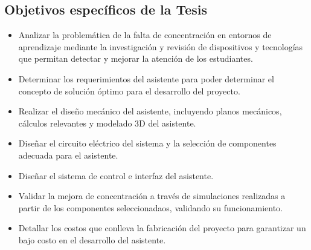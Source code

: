             \subsection{Objetivos específicos de la Tesis}
        \begin{itemize}
            \item Analizar la problemática de la falta  de concentración en entornos de aprendizaje mediante la investigación y revisión de dispositivos y tecnologías que permitan detectar y mejorar la atención de los estudiantes.
            \item Determinar los requerimientos del asistente para poder determinar el concepto de solución óptimo para el desarrollo del proyecto.
           \item Realizar el diseño mecánico del asistente, incluyendo planos mecánicos, cálculos relevantes y modelado 3D del asistente.
            \item Diseñar el circuito eléctrico del sistema y la selección de componentes adecuada para el asistente.
            \item Diseñar el sistema de control e interfaz del asistente.
            
            \item Validar la mejora de concentración a través de simulaciones realizadas a partir de los componentes seleccionadaos, validando su funcionamiento.
            \item Detallar los costos que conlleva la fabricación del proyecto para garantizar un bajo costo en el desarrollo del asistente.
            \end{itemize}
              
